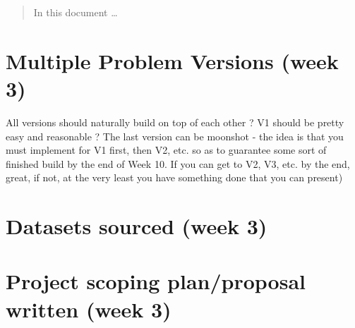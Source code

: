 \documentclass[12pt]{article}
\begin{document}
\maketitle

\begin{abstract}

In this document \ldots
\end{abstract}



\section{Multiple Problem Versions (week 3)}
\label{sec:app}
All versions should naturally build on top of each other
? V1 should be pretty easy and reasonable
? The last version can be moonshot - the idea is that you must implement
for V1 first, then V2, etc. so as to guarantee some sort of finished build by
the end of Week 10. If you can get to V2, V3, etc. by the end, great, if not,
at the very least you have something done that you can present)

\section{Datasets sourced (week 3)}
\label{sec:app}

\section{Project scoping plan/proposal written (week 3)}
\label{sec:app}








\end{document}
